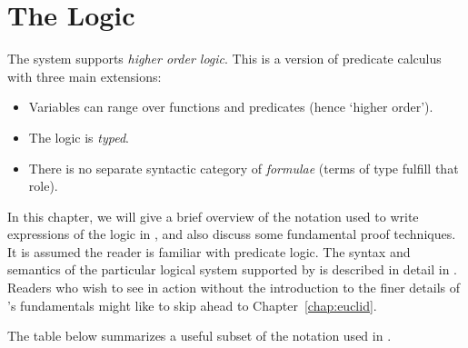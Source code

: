 \chapter{The \HOL{} Logic}\label{HOLlogic}

The \HOL{}  system  supports \emph{higher order logic}.
This is a version of predicate calculus with three main extensions:

\begin{itemize}
\item Variables can range over functions and predicates (hence `higher order').
\item The logic is \emph{typed}.
\item There is no separate syntactic category of \emph{formulae} (terms of type  fulfill that role).
\end{itemize}

In this chapter, we will give a brief overview of the notation used to write expressions of the \HOL{} logic in \ML{}, and also discuss some fundamental  \HOL{} proof techniques.
It is assumed the reader is familiar with predicate logic.
The syntax and semantics of the particular logical system supported by \HOL{} is described in detail in \DESCRIPTION.
Readers who wish to see \HOL{} in action without the introduction to the finer details of \HOL's fundamentals might like to skip ahead to Chapter~\ref{chap:euclid}.


The table below summarizes a useful subset of the notation used in \HOL.

